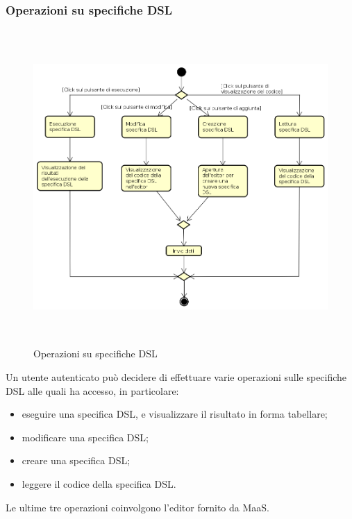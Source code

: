 \subsubsection{Operazioni su specifiche DSL}
\begin{figure}[H]
\begin{center}
\includegraphics[height=12cm]{res/sections/backend/activities/operazioniDSL.png}
\caption{Operazioni su specifiche DSL}
\end{center}
\end{figure}
Un utente autenticato può decidere di effettuare varie operazioni sulle specifiche DSL alle quali ha accesso, in particolare:
\begin{itemize}
\item eseguire una specifica DSL, e visualizzare il risultato in forma tabellare;
\item modificare una specifica DSL;
\item creare una specifica DSL;
\item leggere il codice della specifica DSL.
\end{itemize}
Le ultime tre operazioni coinvolgono l'editor fornito da MaaS.
